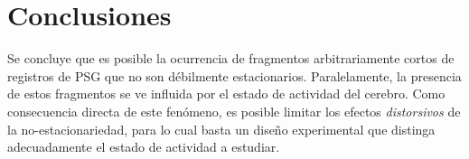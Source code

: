 %
%
%
%
%
%


\section{Conclusiones}

Se concluye que
es posible la ocurrencia de fragmentos arbitrariamente cortos de registros de PSG que no 
son débilmente estacionarios. Paralelamente, la presencia de estos fragmentos se ve influida por el
estado de actividad del cerebro.
%
Como consecuencia directa de este fenómeno, es posible limitar los efectos \textit{distorsivos} de 
la no-estacionariedad, para lo cual basta un diseño experimental que distinga adecuadamente el
estado de actividad a estudiar. 

